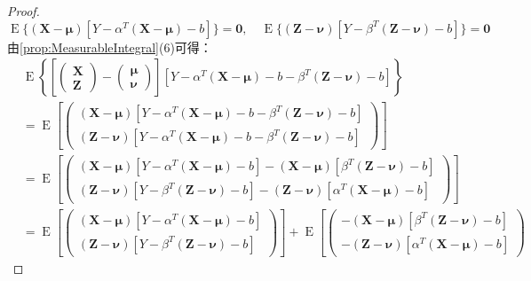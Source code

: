 \begin{proof}
\begin{equation*}
		\operatorname{E}\{(\mathbf{X}-\boldsymbol{\mu})[Y-\alpha^T(\mathbf{X}-\boldsymbol{\mu})-b]\}=\mathbf{0},\quad
		\operatorname{E}\{(\mathbf{Z}-\boldsymbol{\nu})[Y-\beta^T(\mathbf{Z}-\boldsymbol{\nu})-b]\}=\mathbf{0}
	\end{equation*}
	由\cref{prop:MeasurableIntegral}(6)可得：
	\begin{align*}
		&\operatorname{E}\left\{\left[
		\begin{pmatrix}
			\mathbf{X} \\
			\mathbf{Z}
		\end{pmatrix}-
		\begin{pmatrix}
			\boldsymbol{\mu} \\
			\boldsymbol{\nu}
		\end{pmatrix}
		\right][Y-\alpha^T(\mathbf{X}-\boldsymbol{\mu})-b-\beta^T(\mathbf{Z}-\boldsymbol{\nu})-b]\right\} \\
		&=\operatorname{E}\left[
		\begin{pmatrix}
			(\mathbf{X}-\boldsymbol{\mu})[Y-\alpha^T(\mathbf{X}-\boldsymbol{\mu})-b-\beta^T(\mathbf{Z}-\boldsymbol{\nu})-b] \\
			(\mathbf{Z}-\boldsymbol{\nu})[Y-\alpha^T(\mathbf{X}-\boldsymbol{\mu})-b-\beta^T(\mathbf{Z}-\boldsymbol{\nu})-b]
		\end{pmatrix}
		\right] \\
		&=\operatorname{E}\left[
		\begin{pmatrix}
			(\mathbf{X}-\boldsymbol{\mu})[Y-\alpha^T(\mathbf{X}-\boldsymbol{\mu})-b]-(\mathbf{X}-\boldsymbol{\mu})[\beta^T(\mathbf{Z}-\boldsymbol{\nu})-b] \\
			(\mathbf{Z}-\boldsymbol{\nu})[Y-\beta^T(\mathbf{Z}-\boldsymbol{\nu})-b]-(\mathbf{Z}-\boldsymbol{\nu})[\alpha^T(\mathbf{X}-\boldsymbol{\mu})-b]
		\end{pmatrix}
		\right] \\
		&=\operatorname{E}\left[
		\begin{pmatrix}
			(\mathbf{X}-\boldsymbol{\mu})[Y-\alpha^T(\mathbf{X}-\boldsymbol{\mu})-b] \\
			(\mathbf{Z}-\boldsymbol{\nu})[Y-\beta^T(\mathbf{Z}-\boldsymbol{\nu})-b]
		\end{pmatrix}
		\right]+\operatorname{E}\left[
		\begin{pmatrix}
			-(\mathbf{X}-\boldsymbol{\mu})[\beta^T(\mathbf{Z}-\boldsymbol{\nu})-b] \\
			-(\mathbf{Z}-\boldsymbol{\nu})[\alpha^T(\mathbf{X}-\boldsymbol{\mu})-b]
		\end{pmatrix}

\end{align*}
\end{proof}

